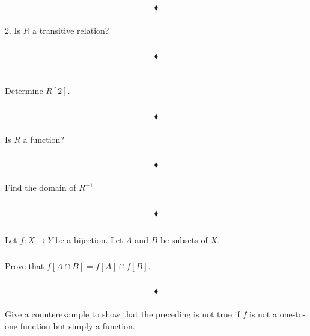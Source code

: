 $$\blacklozenge$$
\subsubsection{}
\begin{tcolorbox}

2. Is $R$ a transitive relation? 
\end{tcolorbox}
$$ $$
 
$$\blacklozenge$$\\
\subsubsection{}
\begin{tcolorbox}
Determine $R[2]$. 
\end{tcolorbox}
$$ $$
 
$$\blacklozenge$$
\subsubsection{}
\begin{tcolorbox}
Is $R$ a function? 
\end{tcolorbox}
$$ $$
 
$$\blacklozenge$$
\subsubsection{}
\begin{tcolorbox}
Find the domain of $R^{-1}$
\end{tcolorbox}
$$ $$
 
$$\blacklozenge$$


\renewcommand{\thesubsection}{\thesection.\RomanNumeralCaps{5}}
\subsection{}
Let $f: X\rightarrow Y$ be a bijection. Let $A$ and $B$ be subsets of $X$.

\subsubsection{}
\begin{tcolorbox}
Prove that $f[A \cap B] = f[A] \cap  f[B]$.
\end{tcolorbox}
$$ $$

$$\blacklozenge$$

\subsubsection{}
\begin{tcolorbox}
Give a counterexample to show that the preceding is not true if $f$ is not a one-to-one function but simply a function. 
\end{tcolorbox}
$$ $$

